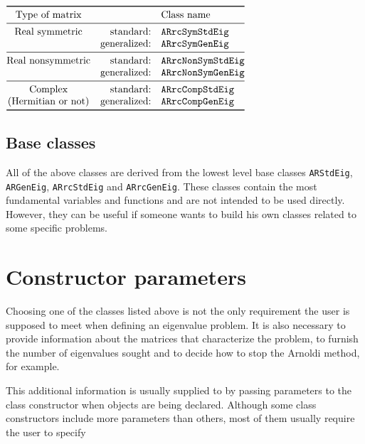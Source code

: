 \begin{center}
	\renewcommand{\arraystretch}{1.2}
	$\begin{array}{@{}crl@{}}\toprule
	\text{Type of matrix} & & \text{Class name} \\\midrule
	\text{Real symmetric} & \text{standard:} & \texttt{ARrcSymStdEig}\\
	& \text{generalized:} & \texttt{ARrcSymGenEig}\\\midrule
	\text{Real nonsymmetric} & \text{standard:} & \texttt{ARrcNonSymStdEig}\\
	& \text{generalized:} & \texttt{ARrcNonSymGenEig}\\\midrule
	\text{Complex} & \text{standard:} & \texttt{ARrcCompStdEig}\\
	\text{(Hermitian or not)} & \text{generalized:} & \texttt{ARrcCompGenEig}\\\bottomrule
	\end{array}$
\end{center}

\subsection{Base classes}

All of the above classes are derived from the lowest level base classes \texttt{ARStdEig}, \texttt{ARGenEig}, \texttt{ARrcStdEig} and \texttt{ARrcGenEig}. These classes contain the most fundamental \ARPP{} variables and functions and are not intended to be used directly. However, they can be useful if someone wants to build his own classes related to some specific problems.

\section{Constructor parameters}

Choosing one of the classes listed above is not the only requirement the user is supposed to meet when defining an eigenvalue problem. It is also necessary to provide information about the matrices that characterize the problem, to furnish the number of eigenvalues sought and to decide how to stop the Arnoldi method, for example.

This additional information is usually supplied to \ARPP{} by passing parameters to the class constructor when objects are being declared. Although some class constructors include more parameters than others, most of them usually require the user to specify

